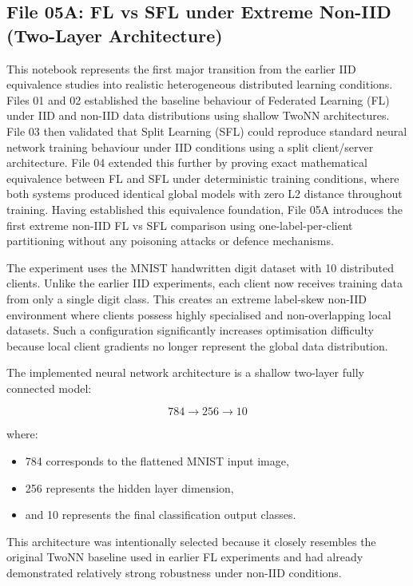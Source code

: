 \subsection*{File 05A: FL vs SFL under Extreme Non-IID (Two-Layer Architecture)}

This notebook represents the first major transition from the earlier IID equivalence studies into realistic heterogeneous distributed learning conditions. Files 01 and 02 established the baseline behaviour of Federated Learning (FL) under IID and non-IID data distributions using shallow TwoNN architectures. File 03 then validated that Split Learning (SFL) could reproduce standard neural network training behaviour under IID conditions using a split client/server architecture. File 04 extended this further by proving exact mathematical equivalence between FL and SFL under deterministic training conditions, where both systems produced identical global models with zero L2 distance throughout training. Having established this equivalence foundation, File 05A introduces the first extreme non-IID FL vs SFL comparison using one-label-per-client partitioning without any poisoning attacks or defence mechanisms.

The experiment uses the MNIST handwritten digit dataset with 10 distributed clients. Unlike the earlier IID experiments, each client now receives training data from only a single digit class. This creates an extreme label-skew non-IID environment where clients possess highly specialised and non-overlapping local datasets. Such a configuration significantly increases optimisation difficulty because local client gradients no longer represent the global data distribution.

The implemented neural network architecture is a shallow two-layer fully connected model:

\[
784 \rightarrow 256 \rightarrow 10
\]

where:
\begin{itemize}
    \item 784 corresponds to the flattened MNIST input image,
    \item 256 represents the hidden layer dimension,
    \item and 10 represents the final classification output classes.
\end{itemize}

This architecture was intentionally selected because it closely resembles the original TwoNN baseline used in earlier FL experiments and had already demonstrated relatively strong robustness under non-IID conditions.

